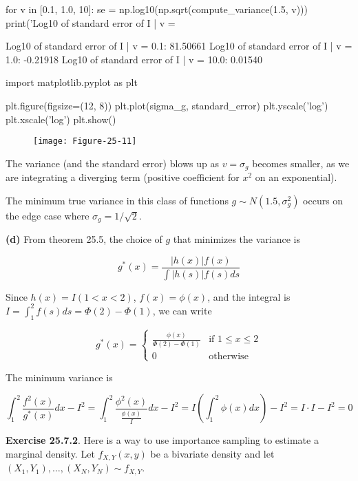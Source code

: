 \begin{python}
for v in [0.1, 1.0, 10]:
    se = np.log10(np.sqrt(compute_variance(1.5, v)))
    print('Log10 of standard error of I | v = %
\end{python}

\begin{console}
Log10 of standard error of I | v = 0.1:   81.50661
Log10 of standard error of I | v = 1.0:   -0.21918
Log10 of standard error of I | v = 10.0:   0.01540
\end{console}

\begin{python}
import matplotlib.pyplot as plt

plt.figure(figsize=(12, 8))
plt.plot(sigma_g, standard_error)
plt.yscale('log')
plt.xscale('log')
plt.show()
\end{python}

\begin{figure}[H]
\texttt{[image: Figure-25-11]}
\end{figure}

The variance (and the standard error) blows up as \(v = \sigma_g\)
becomes smaller, as we are integrating a diverging term (positive
coefficient for \(x^2\) on an exponential).

The minimum true variance in this class of functions
\(g \sim N(1.5, \sigma_g^2)\) occurs on the edge case where
\(\sigma_g = 1 / \sqrt{2}\).

\textbf{(d)} From theorem 25.5, the choice of \(g\) that minimizes the
variance is

\[ g^*(x) = \frac{|h(x)| f(x) }{\int | h(s) | f(s)  ds} \]

Since \(h(x) = I(1 < x < 2)\), \(f(x) = \phi(x)\), and the integral is
\(I = \int_1^2 f(s) ds = \Phi(2) - \Phi(1)\), we can write

\[ g^*(x) = \begin{cases}
\frac{\phi(x)}{\Phi(2) - \Phi(1)} &\text{if } 1 \leq x \leq 2 \\
0 &\text{otherwise }
\end{cases}
\]

The minimum variance is

\[ \int_1^2 \frac{f^2(x)}{g^*(x)} dx - I^2 = \int_1^2 \frac{\phi^2(x)}{\frac{\phi(x)}{I}} dx - I^2 = I \left( \int_1^2 \phi(x) dx \right) - I^2 = I \cdot I - I^2 = 0 \]

\textbf{Exercise 25.7.2}. Here is a way to use importance sampling to
estimate a marginal density. Let \(f_{X, Y}(x, y)\) be a bivariate
density and let \((X_1, Y_1), \dots, (X_N, Y_N) \sim f_{X, Y}\).

